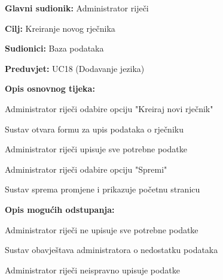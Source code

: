 					\noindent {}
					\begin{packed_item}
						
						\item \textbf{Glavni sudionik: }Administrator riječi
						\item  \textbf{Cilj:} Kreiranje novog rječnika
						\item  \textbf{Sudionici:} Baza podataka
						\item  \textbf{Preduvjet:} UC18 (Dodavanje jezika)
						\item  \textbf{Opis osnovnog tijeka:}
						
						\item[] \begin{packed_enum}
							
							\item Administrator riječi odabire opciju "Kreiraj novi rječnik"
							\item Sustav otvara formu za upis podataka o rječniku 
							\item Administrator riječi upisuje sve potrebne podatke
							\item Administrator riječi odabire opciju "Spremi"
							\item Sustav sprema promjene i prikazuje početnu stranicu
						
						\end{packed_enum}
					
						\item  \textbf{Opis mogućih odstupanja:}
					
						\item[] \begin{packed_item}
						
							\item[3.a] Administrator riječi ne upisuje sve potrebne podatke 
							\item[] \begin{packed_enum}
								
								\item Sustav obavještava administratora o nedostatku podataka 
								
							\end{packed_enum}	
								
							\item[3.b] Administrator riječi neispravno upisuje podatke
							\item[] \begin{packed_enum}
								

\end{packed_enum}
\end{packed_item}
\end{packed_item}

